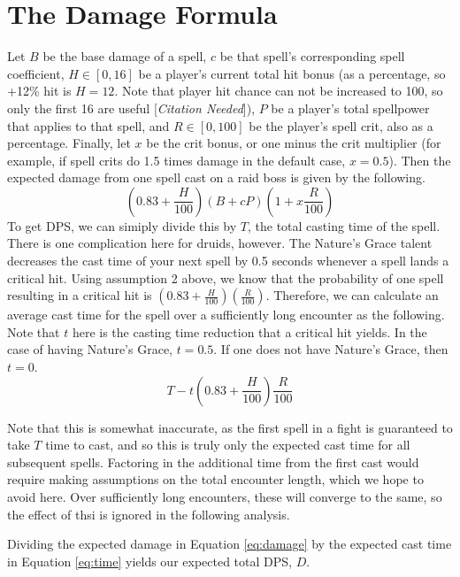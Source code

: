 \documentclass[letterpaper]{article}
\theoremstyle{definition}
\providecommand{\equationref}[1]{Equation \eqref{eq:#1}}
\providecommand{\needscite}{[\textit{Citation Needed}]}
\begin{document}
\section{The Damage Formula}
Let $B$ be the base damage of a spell, $c$ be that spell's corresponding spell coefficient, $H \in [0, 16]$ be a player's current total hit bonus (as a percentage, so +12\% hit is $H = 12$. Note that player hit chance can not be increased to 100, so only the first 16 are useful \needscite), $P$ be a player's total spellpower that applies to that spell, and $R \in [0, 100]$ be the player's spell crit, also as a percentage. Finally, let $x$ be the crit bonus, or one minus the crit multiplier (for example, if spell crits do 1.5 times damage in the default case, $x = 0.5$). Then the expected damage from one spell cast on a raid boss is given by the following.
\begin{equation}
\left(0.83 + \frac{H}{100}\right)\left(B + cP\right)\left(1 + x\frac{R}{100}\right)
\label{eq:damage}
\end{equation}
To get DPS, we can simiply divide this by $T$, the total casting time of the spell. There is one complication here for druids, however. The Nature's Grace talent decreases the cast time of your next spell by 0.5 seconds whenever a spell lands a critical hit. Using assumption 2 above, we know that the probability of one spell resulting in a critical hit is $(0.83 + \frac{H}{100})(\frac{R}{100})$. Therefore, we can calculate an average cast time for the spell over a sufficiently long encounter as the following. Note that $t$ here is the casting time reduction that a critical hit yields. In the case of having Nature's Grace, $t=0.5$. If one does not have Nature's Grace, then $t=0$.
\begin{equation}
T - t\left(0.83 + \frac{H}{100}\right)\frac{R}{100}
\label{eq:time}
\end{equation}

Note that this is somewhat inaccurate, as the first spell in a fight is guaranteed to take $T$ time to cast, and so this is truly only the expected cast time for all subsequent spells. Factoring in the additional time from the first cast would require making assumptions on the total encounter length, which we hope to avoid here. Over sufficiently long encounters, these will converge to the same, so the effect of thsi is ignored in the following analysis.

Dividing the expected damage in \equationref{damage} by the expected cast time in \equationref{time} yields our expected total DPS, $D$.
\end{document}
